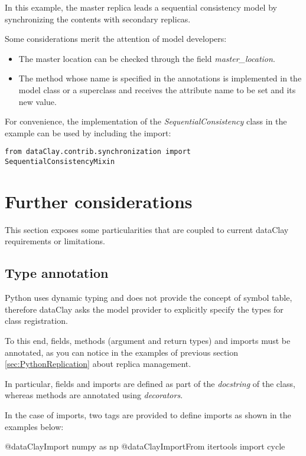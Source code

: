 In this example, the master replica leads a sequential consistency model by synchronizing the contents with secondary replicas.

Some considerations merit the attention of model developers:

\begin{itemize}
    \item The master location can be checked through the field \textit{master\_location}.
    \item The method whose name is specified in the annotations is implemented in the model class or a superclass and receives the attribute name to be set and its new value.
\end{itemize}

For convenience,  the implementation of the \textit{SequentialConsistency} class in the example can be used by including the import:

\colorbox{basecolor!20}{\texttt{from dataClay.contrib.synchronization import SequentialConsistencyMixin}}

\section{Further considerations}
\label{sec:PythonConsiderations}

This section exposes some particularities that are coupled to current dataClay requirements or limitations.

\subsection{Type annotation}

Python uses dynamic typing and does not provide the concept of symbol table, therefore dataClay asks the model provider to explicitly specify the types for class registration.

To this end, fields, methods (argument and return types) and imports must be annotated, as you can notice in the examples of previous section \ref{sec:PythonReplication} about replica management. 

In particular, fields and imports are defined as part of the \textit{docstring} of the class, whereas methods are annotated using \textit{decorators}. 

In the case of imports, two tags are provided to define imports as shown in the examples below:

\begin{tBox}
 \begin{python}
  @dataClayImport numpy as np
  @dataClayImportFrom itertools import cycle
 \end{python}
\end{tBox}

